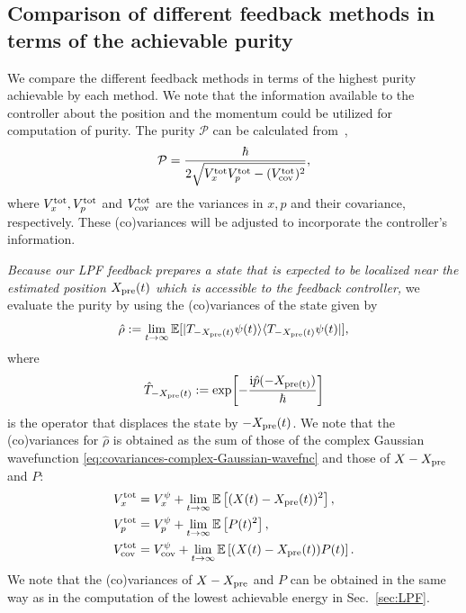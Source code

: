 \documentclass[aps,pra,superscriptaddress,twocolumn
]{revtex4-2}
\renewcommand{\i}{\mathrm{i}}
\newcommand{\majrev}[1]{{#1}}
\begin{document}
 



\majrev{
 \subsection{Comparison of different feedback methods 
 in terms of the achievable purity}


 We compare the different feedback methods in terms of 
 the highest purity achievable by each method.
 We note that 
 the information available to the controller 
 about the position and the momentum could be 
 utilized for computation of purity. 
 The purity $\mathcal{P}$ can be calculated from~\cite{PhysRevA.60.2700,PhysRevA.68.012314}, 
 \begin{equation}
  \mathcal{P} = 
  \frac{\hbar}{2\sqrt{V_x^{\rm tot} V_p^{\rm tot} - (V_{\rm cov}^{\rm tot})^2}},
 \end{equation}
 where $V_x^{\rm tot}, V_p^{\rm tot}$ and $V_{\rm cov}^{\rm tot}$ are the variances in $x,p$ and 
 their covariance, respectively.
 These (co)variances will be adjusted to incorporate the controller's information.
}



 \textit{Because our LPF feedback prepares a state that is expected to be localized 
 near the estimated position $X_{\rm pre}(t)$ which is accessible to the feedback controller,}
 we evaluate the purity by using the (co)variances of the state given by
 \begin{equation}
  \hat \rho := \lim_{t\to \infty}\mathbb{E}[|T_{-X_{\rm pre}(t)}\psi (t) \rangle
  \langle T_{-X_{\rm pre}(t)} \psi(t)|],
  \label{eq:ensemble-state-LPF}
 \end{equation} 
 where 
 \begin{equation}
  \hat T_{-X_{\rm pre}(t)} := \exp[-\frac{\i \hat p (-X_{\rm pre (t)})}{\hbar}]
 \end{equation}
 is the operator that displaces the state by $-X_{\rm pre} (t)$.
 We note that the (co)variances for $\hat \rho$ is obtained 
 as the sum of those of the complex Gaussian wavefunction \eqref{eq:covariances-complex-Gaussian-wavefnc} 
 and those of $X-X_{\rm pre}$ and $P$:
 \begin{alignat}{1}
  V_x^{\rm tot} &= V_x^\psi + \lim_{t\to \infty} \mathbb{E}\left[(X(t)-X_{\rm pre}(t))^2\right],\\
  V_p^{\rm tot} &= V_p^\psi + \lim_{t\to \infty} \mathbb{E}\left[P(t)^2\right],\\
  V_{\rm cov}^{\rm tot} &= V_{\rm cov}^\psi + \lim_{t\to \infty} \mathbb{E}\left[(X(t)-X_{\rm pre}(t)) P(t)\right].
 \end{alignat} 
 We note that the (co)variances of $X-X_{\rm pre}$ and $P$ 
 can be obtained in the same way as in the computation of the lowest achievable energy 
 in Sec.~\ref{sec:LPF}.
\end{document}
